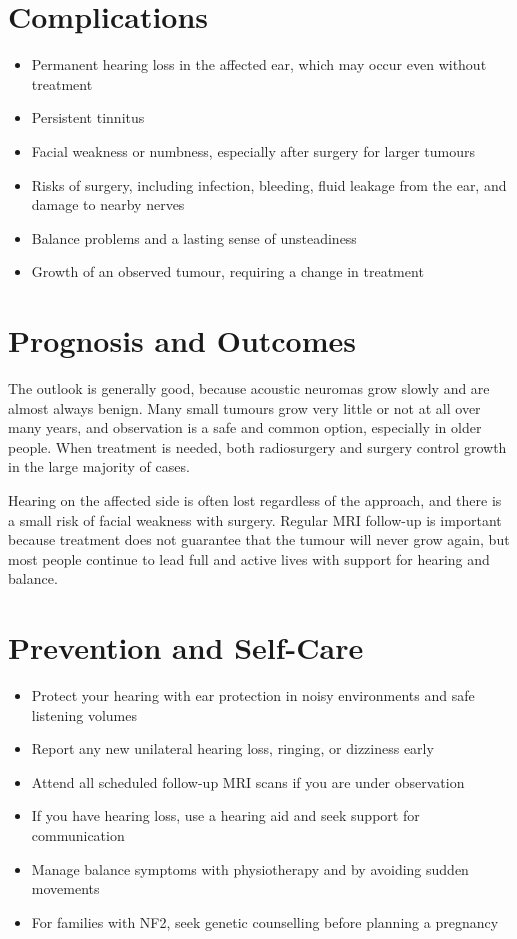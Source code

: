 \section*{Complications}
\begin{itemize}
    \item Permanent hearing loss in the affected ear, which may occur even without treatment
    \item Persistent tinnitus
    \item Facial weakness or numbness, especially after surgery for larger tumours
    \item Risks of surgery, including infection, bleeding, fluid leakage from the ear, and damage to nearby nerves
    \item Balance problems and a lasting sense of unsteadiness
    \item Growth of an observed tumour, requiring a change in treatment
\end{itemize}

\section*{Prognosis and Outcomes}
The outlook is generally good, because acoustic neuromas grow slowly and are almost always benign. Many small tumours grow very little or not at all over many years, and observation is a safe and common option, especially in older people. When treatment is needed, both radiosurgery and surgery control growth in the large majority of cases.

Hearing on the affected side is often lost regardless of the approach, and there is a small risk of facial weakness with surgery. Regular MRI follow-up is important because treatment does not guarantee that the tumour will never grow again, but most people continue to lead full and active lives with support for hearing and balance.

\section*{Prevention and Self-Care}
\begin{itemize}
    \item Protect your hearing with ear protection in noisy environments and safe listening volumes
    \item Report any new unilateral hearing loss, ringing, or dizziness early
    \item Attend all scheduled follow-up MRI scans if you are under observation
    \item If you have hearing loss, use a hearing aid and seek support for communication
    \item Manage balance symptoms with physiotherapy and by avoiding sudden movements
    \item For families with NF2, seek genetic counselling before planning a pregnancy
\end{itemize}

